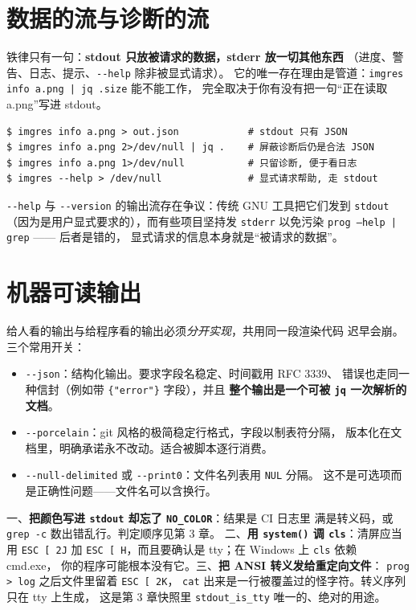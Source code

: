 \documentclass[12pt,a4paper,fontset=fandol]{ctexbook}
\newcommand{\Fn}[1]{\texttt{#1()}}
\newcommand{\Tp}[1]{\texttt{#1}}
\newcommand{\Opt}[1]{\texttt{-\/-#1}}
\begin{document}
\section{数据的流与诊断的流}

铁律只有一句：\textbf{stdout 只放被请求的数据，stderr 放一切其他东西}
（进度、警告、日志、提示、\Opt{help} 除非被显式请求）。
它的唯一存在理由是管道：\Tp{imgres info a.png | jq .size} 能不能工作，
完全取决于你有没有把一句``正在读取 a.png''写进 stdout。

\begin{lstlisting}[style=shellstyle,caption={流的分野如何被验证}]
$ imgres info a.png > out.json            # stdout 只有 JSON
$ imgres info a.png 2>/dev/null | jq .    # 屏蔽诊断后仍是合法 JSON
$ imgres info a.png 1>/dev/null           # 只留诊断, 便于看日志
$ imgres --help > /dev/null               # 显式请求帮助, 走 stdout
\end{lstlisting}

\Opt{help} 与 \Opt{version} 的输出流存在争议：传统 GNU 工具把它们发到
\Tp{stdout}（因为是用户显式要求的），而有些项目坚持发 \Tp{stderr}
以免污染 \Tp{prog --help | grep} —— 后者是错的，
显式请求的信息本身就是``被请求的数据''。

\section{机器可读输出}

给人看的输出与给程序看的输出必须\emph{分开实现}，共用同一段渲染代码
迟早会崩。三个常用开关：

\begin{itemize}
\item \Opt{json}：结构化输出。要求字段名稳定、时间戳用 RFC 3339、
      错误也走同一种信封（例如带 \lstinline|{"error"}| 字段），并且
      \textbf{整个输出是一个可被 \Tp{jq} 一次解析的文档}。
\item \Opt{porcelain}：git 风格的极简稳定行格式，字段以制表符分隔，
      版本化在文档里，明确承诺永不改动。适合被脚本逐行消费。
\item \Opt{null-delimited} 或 \Opt{print0}：文件名列表用 \Tp{NUL} 分隔。
      这不是可选项而是正确性问题——文件名可以含换行。
\end{itemize}

\begin{warning}[title={三个最常见的输出污染}]
一、\textbf{把颜色写进 \Tp{stdout} 却忘了 \Tp{NO\_COLOR}}：结果是 CI 日志里
满是转义码，或 \Tp{grep -c} 数出错乱行。判定顺序见第 3 章。
二、\textbf{用 \Fn{system} 调 \Tp{cls}}：清屏应当用 \Tp{ESC [ 2J}
加 \Tp{ESC [ H}，而且要确认是 tty；在 Windows 上 \Tp{cls} 依赖 cmd.exe，
你的程序可能根本没有它。三、\textbf{把 ANSI 转义发给重定向文件}：
\Tp{prog > log} 之后文件里留着 \Tp{ESC [ 2K}，
\Tp{cat} 出来是一行被覆盖过的怪字符。转义序列只在 tty 上生成，
这是第 3 章快照里 \Tp{stdout\_is\_tty} 唯一的、绝对的用途。
\end{warning}
\end{document}
